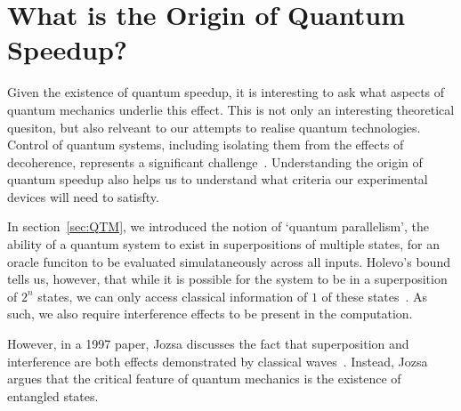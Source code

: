 \documentclass{standalone}
\begin{document}
\section{What is the Origin of Quantum Speedup?}
Given the existence of quantum speedup, it is interesting to ask what aspects of quantum mechanics underlie this effect. This is not only an interesting theoretical quesiton, but also relveant to our attempts to realise quantum technologies. Control of quantum systems, including isolating them from the effects of decoherence, represents a significant challenge~\cite{Shor1997}. Understanding the origin of quantum speedup also helps us to understand what criteria our experimental devices will need to satisfty.
\par
In section~\ref{sec:QTM}, we introduced the notion of `quantum parallelism', the ability of a quantum system to exist in superpositions of multiple states, for an oracle funciton to be evaluated simulataneously across all inputs. Holevo's bound tells us, however, that while it is possible for the system to be in a superposition of $2^{n}$ states, we can only access classical information of $1$ of these states~\cite{holevo1973}. As such, we also require interference effects to be present in the computation.
\par
However, in a 1997 paper, Jozsa discusses the fact that superposition and interference are both effects demonstrated by classical waves~\cite{Jozsa1997}. Instead, Jozsa argues that the critical feature of quantum mechanics is the existence of entangled states. 
\par
\end{document}
